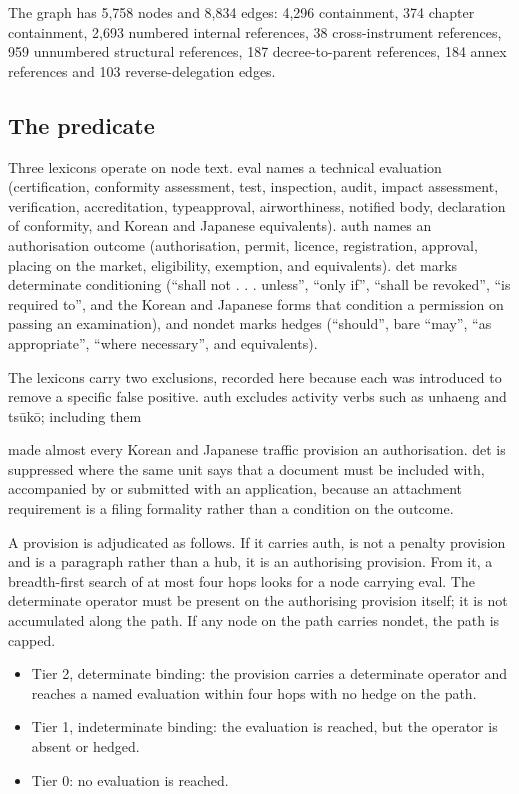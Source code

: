 The graph has 5,758 nodes and 8,834 edges: 4,296 containment, 374 chapter containment, 2,693 numbered internal references, 38 cross-instrument references, 959 unnumbered structural references, 187 decree-to-parent references, 184 annex references and 103 reverse-delegation edges.

\subsection{The predicate}\label{sec:2.5}

Three lexicons operate on node text. eval names a technical evaluation (certification, conformity assessment, test, inspection, audit, impact assessment, verification, accreditation, typeapproval, airworthiness, notified body, declaration of conformity, and Korean and Japanese equivalents). auth names an authorisation outcome (authorisation, permit, licence, registration, approval, placing on the market, eligibility, exemption, and equivalents). det marks determinate conditioning (``shall not . . . unless'', ``only if'', ``shall be revoked'', ``is required to'', and the Korean and Japanese forms that condition a permission on passing an examination), and nondet marks hedges (``should'', bare ``may'', ``as appropriate'', ``where necessary'', and equivalents).

The lexicons carry two exclusions, recorded here because each was introduced to remove a specific false positive. auth excludes activity verbs such as unhaeng and ts\={u}k\={o}; including them

made almost every Korean and Japanese traffic provision an authorisation. det is suppressed where the same unit says that a document must be included with, accompanied by or submitted with an application, because an attachment requirement is a filing formality rather than a condition on the outcome.

A provision is adjudicated as follows. If it carries auth, is not a penalty provision and is a paragraph rather than a hub, it is an authorising provision. From it, a breadth-first search of at most four hops looks for a node carrying eval. The determinate operator must be present on the authorising provision itself; it is not accumulated along the path. If any node on the path carries nondet, the path is capped.

\begin{itemize}
\item Tier 2, determinate binding: the provision carries a determinate operator and reaches a named evaluation within four hops with no hedge on the path.
\item Tier 1, indeterminate binding: the evaluation is reached, but the operator is absent or hedged.
\item Tier 0: no evaluation is reached.
\end{itemize}

